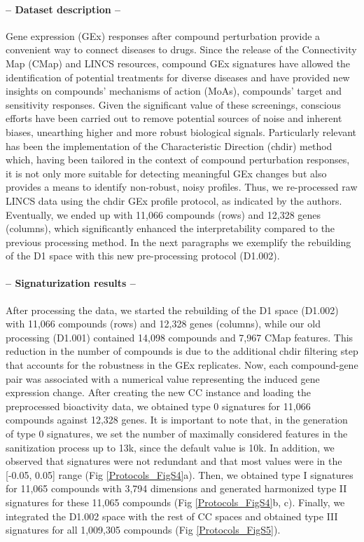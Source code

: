 \paragraph{-- Dataset description --} \leavevmode

Gene expression (GEx) responses after compound perturbation provide a convenient way to connect diseases to drugs. Since the release of the Connectivity Map (CMap) and LINCS resources, compound GEx signatures have allowed the identification of potential treatments for diverse diseases \cite{pauls_identification_2021, sawada_predicting_2018, chen_reversal_2017} and have provided new insights on compounds’ mechanisms of action (MoAs), compounds’ target and sensitivity responses. Given the significant value of these screenings, conscious efforts have been carried out to remove potential sources of noise and inherent biases, unearthing higher and more robust biological signals. Particularly relevant has been the implementation of the Characteristic Direction (chdir) method\cite{clark_characteristic_2014} which, having been tailored in the context of compound perturbation responses, it is not only more suitable for detecting meaningful GEx changes but also provides a means to identify non-robust, noisy profiles. Thus, we re-processed raw LINCS data using the chdir GEx profile protocol, as indicated by the authors. Eventually, we ended up with 11,066 compounds (rows) and 12,328 genes (columns), which significantly enhanced the interpretability compared to the previous processing method. In the next paragraphs we exemplify the rebuilding of the D1 space with this new pre-processing protocol (D1.002). 

\paragraph{-- Signaturization results --}  \leavevmode

After processing the data, we started the rebuilding of the D1 space (D1.002) with 11,066 compounds (rows) and 12,328 genes (columns), while our old processing (D1.001) contained 14,098 compounds and 7,967 CMap features. This reduction in the number of compounds is due to the additional chdir filtering step that accounts for the robustness in the GEx replicates. Now, each compound-gene pair was associated with a numerical value representing the induced gene expression change. After creating the new CC instance and loading the preprocessed bioactivity data, we obtained type 0 signatures for 11,066 compounds against 12,328 genes. It is important to note that, in the generation of type 0 signatures, we set the number of maximally considered features in the sanitization process up to 13k, since the default value is 10k. In addition, we observed that signatures were not redundant and that most values were in the [-0.05, 0.05] range (Fig \ref{Protocols_FigS4}a). Then, we obtained type I signatures for 11,065 compounds with 3,794 dimensions and generated harmonized type II signatures for these 11,065 compounds (Fig \ref{Protocols_FigS4}b, c). Finally, we integrated the D1.002 space with the rest of CC spaces and obtained type III signatures for all 1,009,305 compounds (Fig \ref{Protocols_FigS5}). 

